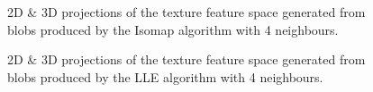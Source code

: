 \begin{figure}[H]
	\centering
	\caption{2D \& 3D projections of the texture feature space generated from blobs produced by the Isomap algorithm with 4 neighbours.}\label{fig:texture_iso_mapping}
\end{figure}

\begin{figure}[H]
	\centering
	\caption{2D \& 3D projections of the texture feature space generated from blobs produced by the LLE algorithm with 4 neighbours.}\label{fig:texture_LLE_mapping}
\end{figure}
\clearpage

